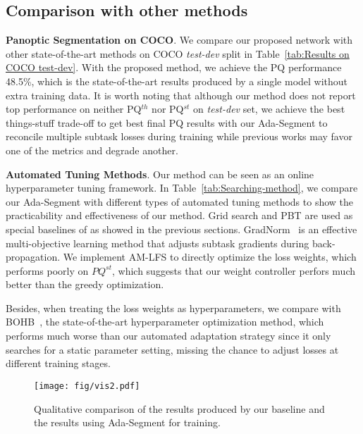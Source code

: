 \documentclass[letterpaper]{article} \usepackage{aaai21}  \usepackage{times}  \usepackage{helvet} \usepackage{courier}  \usepackage[hyphens]{url}  \usepackage{graphicx} \urlstyle{rm} \def\UrlFont{\rm}  \usepackage{natbib}  \usepackage{caption} \frenchspacing  \setlength{\pdfpagewidth}{8.5in}  \setlength{\pdfpageheight}{11in}
\begin{document}
 


 






\subsection{Comparison with other methods}


\noindent
\textbf{Panoptic Segmentation on COCO}.
We compare our proposed network with other state-of-the-art methods
on COCO \textit{test-dev} split in Table~\ref{tab:Results on COCO test-dev}. 
With the proposed method, we achieve the PQ performance 48.5\%, which
is the state-of-the-art results produced by a single model without
extra training data. 
It is worth noting that although our method does
not report top performance on neither PQ$^{th}$ nor PQ$^{st}$ on
\textit{test-dev} set, 
we achieve the best things-stuff trade-off to get best final PQ results
with our Ada-Segment to reconcile multiple subtask losses during training while previous works may favor
one of the metrics and degrade another. 
 

\noindent
\textbf{Automated Tuning Methods}.
Our method can be seen as an online hyperparameter tuning framework. 
In Table~\ref{tab:Searching-method}, we compare our Ada-Segment with different types
of automated tuning methods to show the practicability and effectiveness of our method.
Grid search and PBT\cite{jaderberg2017pbt} are used as special baselines of as showed in the previous sections. 
GradNorm~\cite{chen2017gradnorm} is an effective multi-objective learning method 
that adjusts subtask gradients during back-propagation. 
We implement AM-LFS\cite{li2019AMlfs} to directly optimize the loss weights, which 
performs poorly on $PQ^{st}$, which suggests that our weight controller perfors much 
better than the greedy optimization.


Besides, when treating the loss weights as hyperparameters, we compare 
with BOHB~\cite{falkner2018bohb}, the state-of-the-art hyperparameter
optimization method, which performs much worse than our automated adaptation strategy since 
it only searches for a static parameter setting, missing the chance to adjust losses 
at different training stages. 

\begin{figure}[t]
  \centering    
\texttt{[image: fig/vis2.pdf]}    
\caption{Qualitative comparison of the results produced by our baseline and 
  the results using Ada-Segment for training. }
  \label{visualization}   
\end{figure}
\end{document}
